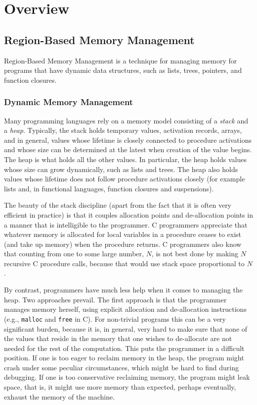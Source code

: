 \documentclass[12pt]{book}
\begin{document}
\part{Overview}

\chapter{Region-Based Memory Management}
\label{intro.sec}
Region-Based Memory Management is a technique for managing
memory for programs that have dynamic data structures, such as lists,
trees, pointers, and function closures.

\section{%
Dynamic Memory Management}
Many programming languages rely on a memory model consisting of a {\em
  stack}
%
and a 
%
{\em heap}. Typically, the stack holds temporary values, activation
records, arrays, and in general, values whose lifetime is closely
connected to procedure activations and whose size can be determined at
the latest when creation of the value begins.  The heap is what holds
all the other values. In particular, the heap holds values whose size
can grow dynamically, such as lists and trees. The heap also holds
values whose lifetime does not follow procedure activations closely
(for example lists and, in functional languages, function closures and
suspensions).

The beauty of the stack discipline (apart from the fact that it is
often very efficient in practice) is that it couples allocation points
and de-allocation points in a manner that is intelligible to the
programmer. C programmers appreciate that whatever memory is allocated
for local variables in a procedure ceases to exist (and take up
memory) when the procedure returns.
%
C programmers also know that counting from one to some large number,
$N$, is not best done by making $N$ recursive C procedure calls,
because that would use stack space proportional to $N$.

By contrast, programmers have much less help when it comes to managing
the heap.  Two approaches prevail. The first approach is that the
programmer manages memory herself, using explicit allocation and
de-allocation instructions (e.g., 
%
{\tt malloc} and 
%
{\tt free} in C). For non-trivial programs this can be a very
significant burden, because it is, in general, very hard to make sure
that none of the values that reside in the memory that one wishes to
de-allocate are not needed for the rest of the computation.  This puts
the programmer in a difficult position. If one is too eager to reclaim
memory in the heap, the program might crash under some peculiar
circumstances, which might be hard to find during debugging.  If one
is too conservative reclaiming memory, the program might leak space,
that is, it might use more memory than expected, perhaps eventually,
exhaust the memory of the machine.
\end{document}
